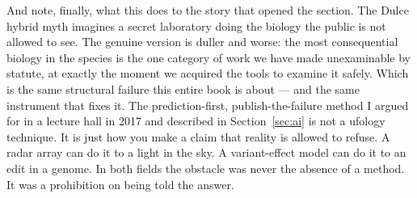 And note, finally, what this does to the story that opened the section. The Dulce hybrid myth imagines
a secret laboratory doing the biology the public is not allowed to see. The genuine version is duller
and worse: the most consequential biology in the species is the one category of work we have made
unexaminable by statute, at exactly the moment we acquired the tools to examine it safely. Which is
the same structural failure this entire book is about --- and the same instrument that fixes it. The
prediction-first, publish-the-failure method I argued for in a lecture hall in 2017 and described in
Section~\ref{sec:ai} is not a ufology technique. It is just how you make a claim that reality is
allowed to refuse. A radar array can do it to a light in the sky. A variant-effect model can do it to
an edit in a genome. In both fields the obstacle was never the absence of a method. It was a
prohibition on being told the answer.

